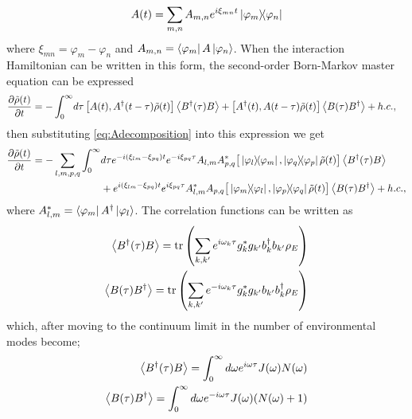 \documentclass[]{article}
\begin{document}
\begin{equation}
\label{eq:Adecomposition}
A(t) = \sum_{m,n} A_{m,n} e^{i\xi_{mn}t}\dyad{\varphi_m}{\varphi_n}
\end{equation}
where $\xi_{mn} = \varphi_m - \varphi_n$ and $A_{m,n} = \bra{\varphi_m}A\ket{\varphi_n}$. When the interaction Hamiltonian can be written in this form, the second-order Born-Markov master equation can be expressed
\begin{align}
	\begin{split}
		\label{eq:BornMarkov}
		\pdv{\tilde{\rho}(t)}{t} = - \int_{0}^{\infty}& d\tau  \left[A(t), A^{\dagger}(t-\tau)\tilde{\rho}(t)\right] \expval{B^{\dagger}(\tau)B} + \left[A^{\dagger}(t),A(t-\tau)\tilde{\rho}(t)\right] \expval{B(\tau)B^{\dagger}} + h.c.,
	\end{split}
\end{align}
then substituting \ref{eq:Adecomposition} into this expression we get
\begin{align}
	\begin{split}
		\pdv{\tilde{\rho}(t)}{t} = - \sum_{l,m,p,q}\int_{0}^{\infty}& d\tau e^{-i(\xi_{lm}-\xi_{pq})t} e^{-i\xi_{pq}\tau} A_{l,m}A_{p,q}^{*}\big[\dyad{\varphi_l}{\varphi_m}, \dyad{\varphi_q}{\varphi_p}\tilde{\rho}(t)\big] \expval{B^{\dagger}(\tau)B} \\
		&+ e^{i(\xi_{lm}-\xi_{pq})t} e^{i\xi_{pq}\tau} A_{l,m}^{*}A_{p,q}\big[\dyad{\varphi_m}{\varphi_l}, \dyad{\varphi_p}{\varphi_q}\tilde{\rho}(t)\big] \expval{B(\tau)B^{\dagger}} + h.c.,
	\end{split}
\end{align}
where $A_{l,m}^*=\bra{\varphi_m}A^{\dagger}\ket{\varphi_l}$. The correlation functions can be written as
\begin{align}
	\begin{split}
		\expval{B^{\dagger}(\tau)B} = \tr\left(\sum_{k,k^{\prime}}e^{i\omega_k \tau}g_k^*g_{k^{\prime}} b_k^{\dagger}b_{k^{\prime}}\rho_E\right)\\
		\expval{B(\tau)B^{\dagger}}=\tr\left(\sum_{k,k^{\prime}}e^{-i\omega_k \tau}g_k^*g_{k^{\prime}} b_{k^{\prime}}b_k^{\dagger}\rho_E\right)
	\end{split}
\end{align}
which, after moving to the continuum limit in the number of environmental modes become;
\begin{align}
	\begin{split}
		\expval{B^{\dagger}(\tau)B} = \int_0^{\infty}d\omega e^{i\omega \tau}J(\omega)N(\omega)\\
		\expval{B(\tau)B^{\dagger}}=\int_0^{\infty}d\omega e^{-i\omega \tau}J(\omega)(N(\omega)+1)
	\end{split}
\end{align}
\end{document}
